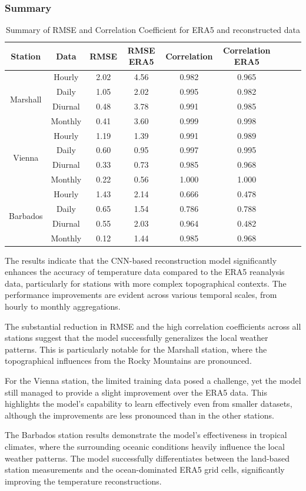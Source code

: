 \subsubsection*{Summary}

\begin{table}
\centering
\begin{tabular}{|c|c|c|c|c|c|c|c|c|}
\hline
Station & Data & RMSE & RMSE ERA5 & Correlation & Correlation ERA5 \\
\hline
\multirow{4}{*}{Marshall} & Hourly & 2.02 & 4.56 & 0.982 & 0.965 \\
& Daily & 1.05 & 2.02 & 0.995 & 0.982 \\
& Diurnal & 0.48 & 3.78 & 0.991 & 0.985 \\
& Monthly & 0.41 & 3.60 & 0.999 & 0.998 \\
\hline
\multirow{4}{*}{Vienna} & Hourly & 1.19 & 1.39 & 0.991 & 0.989 \\
& Daily & 0.60 & 0.95 & 0.997 & 0.995 \\
& Diurnal & 0.33 & 0.73 & 0.985 & 0.968 \\
& Monthly & 0.22 & 0.56 & 1.000 & 1.000 \\
\hline
\multirow{4}{*}{Barbados} & Hourly & 1.43 & 2.14 & 0.666 & 0.478 \\
& Daily & 0.65 & 1.54 & 0.786 & 0.788 \\
& Diurnal & 0.55 & 2.03 & 0.964 & 0.482 \\
& Monthly & 0.12 & 1.44 & 0.985 & 0.968 \\
\hline
\end{tabular}
\caption{Summary of RMSE and Correlation Coefficient for ERA5 and reconstructed data}
\label{tab:results_summary}
\end{table}

The results indicate that the CNN-based reconstruction model significantly enhances the accuracy of temperature data compared to the ERA5 reanalysis data, particularly for stations with more complex topographical contexts. The performance improvements are evident across various temporal scales, from hourly to monthly aggregations.

The substantial reduction in RMSE and the high correlation coefficients across all stations suggest that the model successfully generalizes the local weather patterns. This is particularly notable for the Marshall station, where the topographical influences from the Rocky Mountains are pronounced.

For the Vienna station, the limited training data posed a challenge, yet the model still managed to provide a slight improvement over the ERA5 data. This highlights the model's capability to learn effectively even from smaller datasets, although the improvements are less pronounced than in the other stations.

The Barbados station results demonstrate the model's effectiveness in tropical climates, where the surrounding oceanic conditions heavily influence the local weather patterns. The model successfully differentiates between the land-based station measurements and the ocean-dominated ERA5 grid cells, significantly improving the temperature reconstructions.